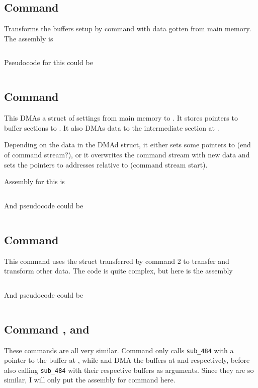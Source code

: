 \subsection{Command }
Transforms the buffers setup by command  with data gotten from main memory. The assembly is 

\inputminted[fontsize=\small]{asm}{../ucode/command_1.asm}

Pseudocode for this could be 

\inputminted{cpp}{../ucode/command_1.c}

\subsection{Command }
This DMAs a struct of settings from main memory to . It stores pointers to buffer sections to . It also DMAs data to the intermediate section at . 

Depending on the data in the DMAd struct, it either sets some pointers to  (end of command stream?), or it overwrites the command stream with new data and sets the pointers to addresses relative to  (command stream start).

Assembly for this is

\inputminted[fontsize=\small]{asm}{../ucode/command_2.asm}

And pseudocode could be

\inputminted{cpp}{../ucode/command_2.c}

\subsection{Command }
This command uses the struct transferred by command 2 to transfer and transform other data. The code is quite complex, but here is the assembly

\inputminted[fontsize=\small]{asm}{../ucode/command_3.asm}

And pseudocode could be

\inputminted{cpp}{../ucode/command_3.c}

\subsection{Command ,  and }
These commands are all very similar. Command  only calls \texttt{sub_484} with a pointer to the buffer at , while  and  DMA the buffers at  and  respectively, before also calling \texttt{sub_484} with their respective buffers as arguments. Since they are so similar, I will only put the assembly for command  here.

